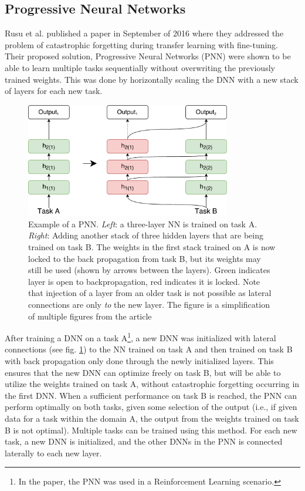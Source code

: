 \subsection{Progressive Neural Networks}
Rusu et al. published a paper in September of 2016\cite{progressiveneuralnetworks} where they addressed the problem of catastrophic forgetting during transfer learning with fine-tuning. Their proposed solution, Progressive Neural Networks (PNN) were shown to be able to learn multiple tasks sequentially without overwriting the previously trained weights. This was done by horizontally scaling the DNN with a new stack of layers for each new task.
\begin{figure}[ht]
    \centering
    \includegraphics[width=0.8\textwidth]{Chapters/2.Background/figures/ProgressiveNeuralNet.pdf}
    \caption[Progressive Neural Network]{Example of a PNN. \textit{Left}: a three-layer NN is trained on task A. \textit{Right}: Adding another stack of three hidden layers that are being trained on task B. The weights in the first stack trained on A is now locked to the back propagation from task B, but its weights may still be used (shown by arrows between the layers). Green indicates layer is open to backpropagation, red indicates it is locked. Note that injection of a layer from an older task is not possible as lateral connections are only \textit{to} the new layer. The figure is a simplification of multiple figures from the article\cite{progressiveneuralnetworks}}
    \label{fig:pnn}
\end{figure}
After training a DNN on a task A\footnote{In the paper, the PNN was used in a Reinforcement Learning scenario.}, a new DNN was initialized with lateral connections (see fig. \ref{fig:pnn}) to the NN trained on task A and then trained on task B with back propagation only done through the newly initialized layers. This ensures that the new DNN can optimize freely on task B, but will be able to utilize the weights trained on task A, without catastrophic forgetting occurring in the first DNN. When a sufficient performance on task B is reached, the PNN can perform optimally on both tasks, given some selection of the output (i.e., if given data for a task within the domain A, the output from the weights trained on task B is not optimal). Multiple tasks can be trained using this method. For each new task, a new DNN is initialized, and the other DNNs in the PNN is connected laterally to each new layer. 

